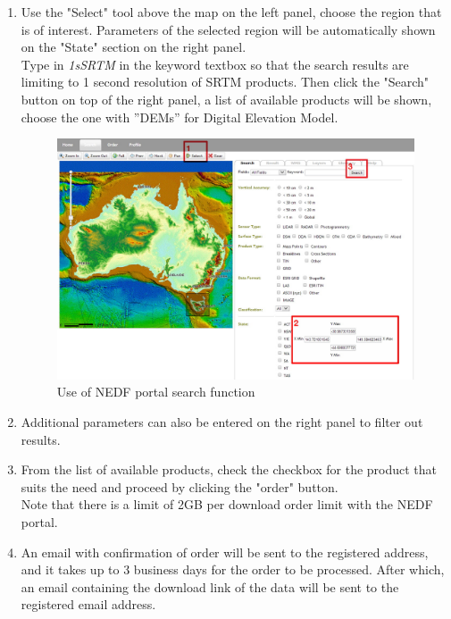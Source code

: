 \begin{enumerate}
\item
Use the "Select" tool above the map on the left panel, choose the region that is of interest. Parameters of the selected region will be automatically shown on the "State" section on the right panel.\\
Type in \emph{1sSRTM} in the keyword textbox so that the search results are limiting to 1 second resolution of SRTM products. Then click the "Search" button on top of the right panel, a list of available products will be shown, choose the one with ''DEMs'' for Digital Elevation Model.
	\begin{figure}[H]\begin{center}
	\includegraphics[width=\textwidth]{gfx/appendixf1.jpg}
	\caption{Use of NEDF portal search function}
	\end{center}\end{figure}
\item
Additional parameters can also be entered on the right panel to filter out results.
\item
From the list of available products, check the checkbox for the product that suits the need and proceed by clicking the "order" button. \\
Note that there is a limit of 2GB per download order limit with the NEDF portal.
\item
An email with confirmation of order will be sent to the registered address, and it takes up to 3 business days for the order to be processed. 
After which, an email containing the download link of the data will be sent to the registered email address.

\end{enumerate}





